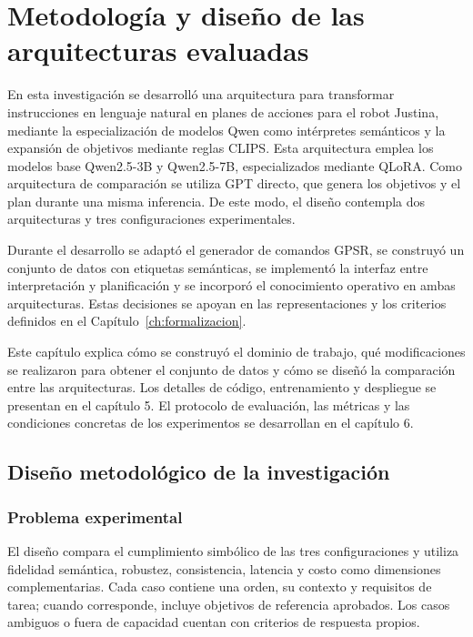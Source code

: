 \chapter{Metodología y diseño de las arquitecturas evaluadas}
\label{ch:metodologia}

En esta investigación se desarrolló una arquitectura para transformar
instrucciones en lenguaje natural en planes de acciones para el robot
Justina, mediante la especialización de modelos Qwen como intérpretes
semánticos y la expansión de objetivos mediante reglas CLIPS.
Esta arquitectura emplea los modelos base Qwen2.5-3B y Qwen2.5-7B, especializados mediante QLoRA.
Como arquitectura de comparación se utiliza GPT directo, que genera
los objetivos y el plan durante una misma inferencia. De este modo,
el diseño contempla dos arquitecturas y tres configuraciones
experimentales.

Durante el desarrollo se adaptó el generador de comandos GPSR, se construyó un
conjunto de datos con etiquetas semánticas, se implementó la interfaz entre
interpretación y planificación y se incorporó el conocimiento operativo
en ambas arquitecturas. Estas decisiones se apoyan en las
representaciones y los criterios definidos en el
Capítulo~\ref{ch:formalizacion}.

Este capítulo explica cómo se construyó el dominio de trabajo, qué
modificaciones se realizaron para obtener el conjunto de datos y cómo se
diseñó la comparación entre las arquitecturas. Los detalles de código,
entrenamiento y despliegue se presentan en el capítulo 5. El protocolo de
evaluación, las métricas y las condiciones concretas de los experimentos
se desarrollan en el capítulo 6.

\section{Diseño metodológico de la investigación}
\label{sec:diseno_metodologico}

\subsection{Problema experimental}

El diseño compara el cumplimiento simbólico de las tres configuraciones y utiliza fidelidad semántica, robustez, consistencia, latencia y costo como dimensiones complementarias. Cada caso contiene una orden, su contexto y requisitos de tarea; cuando corresponde, incluye objetivos de referencia aprobados. Los casos ambiguos o fuera de capacidad cuentan con criterios de respuesta propios.

